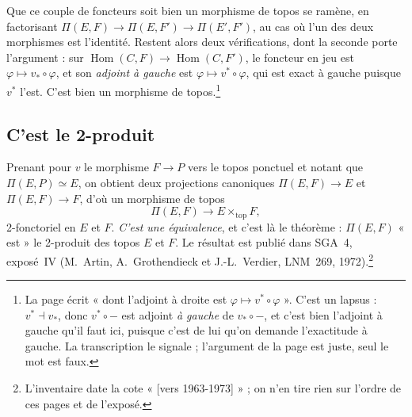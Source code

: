 \documentclass[11pt,a4paper]{article}
\begin{document}
Que ce couple de foncteurs soit bien un morphisme de topos se ramène, en
factorisant $\Pi(E,F) \to \Pi(E,F') \to \Pi(E',F')$, au cas où l'un des deux
morphismes est l'identité. Restent alors deux vérifications, dont la seconde
porte l'argument : sur $\operatorname{Hom}(C, F) \to \operatorname{Hom}(C, F')$, le
foncteur en jeu est $\varphi \mapsto v_{*} \circ \varphi$, et son \emph{adjoint
à gauche} est $\varphi \mapsto v^{*} \circ \varphi$, qui est exact à gauche
puisque $v^{*}$ l'est. C'est bien un morphisme de topos.\footnote{La page écrit
« dont l'adjoint à droite est $\varphi \mapsto v^{*} \circ \varphi$ ». C'est un
lapsus : $v^{*} \dashv v_{*}$, donc $v^{*} \circ -$ est adjoint \emph{à gauche}
de $v_{*} \circ -$, et c'est bien l'adjoint à gauche qu'il faut ici, puisque
c'est de lui qu'on demande l'exactitude à gauche. La transcription le signale ;
l'argument de la page est juste, seul le mot est faux.}

\subsection*{C'est le 2-produit}

Prenant pour $v$ le morphisme $F \to P$ vers le topos ponctuel et notant que
$\Pi(E,P) \simeq E$, on obtient deux projections canoniques $\Pi(E,F) \to E$ et
$\Pi(E,F) \to F$, d'où un morphisme de topos
\[
\Pi(E,F) \longrightarrow E \times_{\mathrm{top}} F,
\]
2-fonctoriel en $E$ et $F$. \emph{C'est une équivalence}, et c'est là le
théorème : $\Pi(E,F)$ « est » le 2-produit des topos $E$ et $F$. Le résultat
est publié dans SGA~4, exposé~IV (M.~Artin, A.~Grothendieck et
J.-L.~Verdier, LNM~269, 1972).\footnote{L'inventaire date la cote « [vers
1963-1973] » ; on n'en tire rien sur l'ordre de ces pages et de l'exposé.}
\end{document}
